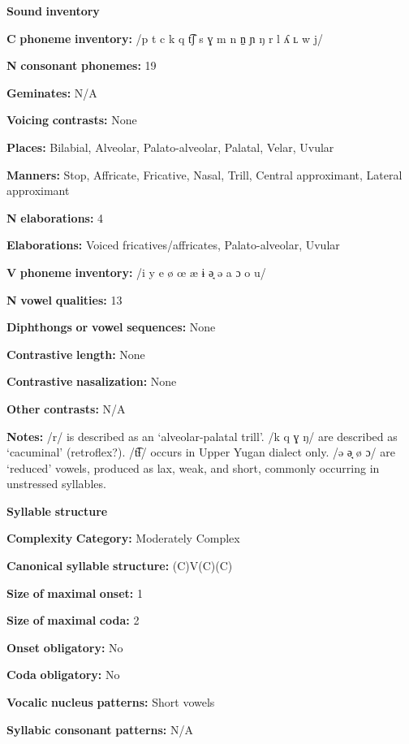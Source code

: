 \textbf{Sound} \textbf{inventory}

\textbf{C} \textbf{phoneme} \textbf{inventory:} /p t c k q t͡ʃ s ɣ m n n̠ ɲ ŋ r l ʎ ʟ w j/

\textbf{N} \textbf{consonant} \textbf{phonemes:} 19

\textbf{Geminates:} N/A

\textbf{Voicing} \textbf{contrasts:} None

\textbf{Places:} Bilabial, Alveolar, Palato-alveolar, Palatal, Velar, Uvular

\textbf{Manners:} Stop, Affricate, Fricative, Nasal, Trill, Central approximant, Lateral approximant

\textbf{N} \textbf{elaborations:} 4

\textbf{Elaborations:} Voiced fricatives/affricates, Palato-alveolar, Uvular

\textbf{V} \textbf{phoneme} \textbf{inventory:} /i y e ø œ æ ɨ ə̘ ə a ɔ o u/

\textbf{N} \textbf{vowel} \textbf{qualities:} 13

\textbf{Diphthongs} \textbf{or} \textbf{vowel} \textbf{sequences:} None

\textbf{Contrastive} \textbf{length:} None

\textbf{Contrastive} \textbf{nasalization:} None

\textbf{Other} \textbf{contrasts:} N/A

\textbf{Notes:} /r/ is described as an ‘alveolar-palatal trill’. /k q ɣ ŋ/ are described as ‘cacuminal’ (retroflex?). /t͡ɬ/ occurs in Upper Yugan dialect only. /ə ə̘ ø ɔ/ are ‘reduced’ vowels, produced as lax, weak, and short, commonly occurring in unstressed syllables.

\textbf{Syllable} \textbf{structure}

\textbf{Complexity} \textbf{Category:} Moderately Complex

\textbf{Canonical} \textbf{syllable} \textbf{structure:} (C)V(C)(C) \citep[53-7]{Filchenko2007}

\textbf{Size} \textbf{of} \textbf{maximal} \textbf{onset:} 1

\textbf{Size} \textbf{of} \textbf{maximal} \textbf{coda:} 2

\textbf{Onset} \textbf{obligatory:} No

\textbf{Coda} \textbf{obligatory:} No

\textbf{Vocalic} \textbf{nucleus} \textbf{patterns:} Short vowels

\textbf{Syllabic} \textbf{consonant} \textbf{patterns:} N/A

